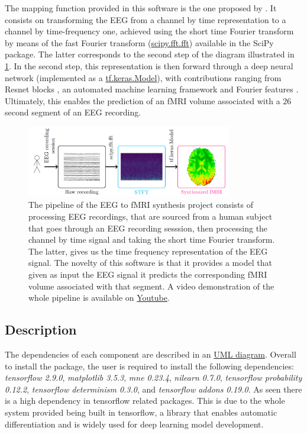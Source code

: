 The mapping function provided in this software is the one proposed by \cite{calhas2022eeg}. It consists on transforming the EEG from a channel by time representation to a channel by time-frequency one, achieved using the short time Fourier transform \cite{allen1977short} by means of the fast Fourier transform (\href{https://docs.scipy.org/doc/scipy/reference/generated/scipy.fft.fft.html}{scipy.fft.fft}) available in the SciPy package. The latter corresponds to the second step of the diagram illustrated in \ref{fig:pipeline}. In the second step, this representation is then forward through a deep neural network (implemented as a \href{https://www.tensorflow.org/api_docs/python/tf/keras/Model}{tf.keras.Model}), with contributions ranging from Resnet blocks \cite{he2016deep}, an automated machine learning framework \cite{calhas2022automatic} and Fourier features \cite{tancik2020fourier}. Ultimately, this enables the prediction of an fMRI volume associated with a $26$ second segment of an EEG recording. 

\begin{figure}[t]
    \centering
    \includegraphics[width=0.8\textwidth]{figures/diagram.png}
    \caption{The pipeline of the EEG to fMRI synthesis project consists of processing EEG recordings, that are sourced from a human subject that goes through an EEG recording sesssion, then processing the channel by time signal and taking the short time Fourier transform. The latter, gives us the time frequency representation of the EEG signal. The novelty of this software is that it provides a model that given as input the EEG signal it predicts the corresponding fMRI volume associated with that segment. A video demonstration of the whole pipeline is available on \href{https://youtu.be/47uJbI0hU_I}{Youtube}.}
    \label{fig:pipeline}
\end{figure}

\subsection{Description}\label{section:description}

The dependencies of each component are described in an \href{https://github.com/eeg-to-fmri/eeg-to-fmri/blob/main/project_UML.pdf}{UML diagram}. Overall to install the package, the user is required to install the following dependencies: \textit{tensorflow 2.9.0}, \textit{matplotlib 3.5.3}, \textit{mne 0.23.4}, \textit{nilearn 0.7.0}, \textit{tensorflow probability 0.12.2}, \textit{tensorflow determinism 0.3.0}, and \textit{tensorflow addons 0.19.0}. As seen there is a high dependency in tensorflow related packages. This is due to the whole system provided being built in tensorflow, a library that enables automatic differentiation and is widely used for deep learning model development.

